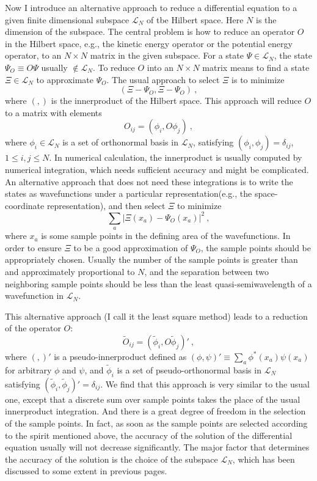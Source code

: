 Now I introduce an alternative approach to reduce a differential equation to
a given finite dimensional subspace $\mathcal{L}_N$ of tbe Hilbert space.
Here $N$ is the dimension of the subspace. The central problem is how
to reduce an operator $O$ in the Hilbert
space, e.g., the kinetic energy operator or the potential energy operator,
to an $N\times N$ matrix in the given subspace. For a state
$\Psi\in\mathcal{L}_N$, the state $\Psi_O\equiv O\Psi$ usually
$\notin\mathcal{L}_N$. To reduce $O$ into an $N\times N$ matrix means to
find a state $\Xi\in\mathcal{L}_N$ to approximate $\Psi_O$. The usual approach
to select $\Xi$ is to minimize
$$(\Xi-\Psi_O, \Xi-\Psi_O)~,$$
where $(,)$ is the
innerproduct of the Hilbert space. This approach will reduce $O$ to a matrix
with elements
$$O_{ij}=(\phi_i, O\phi_j)~,$$
where $\phi_i\in\mathcal{L}_N$ is a set of orthonormal basis in $\mathcal{L}_N$,
satisfying $(\phi_i, \phi_j)=\delta_{ij}$, $1\le i, j\le N$. In numerical
calculation, the innerproduct is usually computed by numerical integration,
which needs sufficient accuracy and might be complicated. An alternative approach
that does not need these integrations is to write the states as
wavefunctions under a particular representation(e.g., the space-coordinate
representation), and then select $\Xi$ to minimize
$$\sum_{a}{|\Xi(x_{a})-\Psi_{O}(x_{a})|}^{2}~,$$
where $x_a$ is some sample points in the defining area of the wavefunctions.
In order to ensure $\Xi$ to be a good approximation of $\Psi_O$, the sample
points should be appropriately chosen. Usually the number of the sample points
is greater than and approximately proportional to $N$, and the separation between
two neighboring sample points should be less than the least quasi-semiwavelength
of a wavefunction in $\mathcal{L}_N$.

This alternative approach (I call it the least square method)
leads to a reduction of the operator $O$:
$$\tilde{O}_{ij}=(\tilde{\phi}_{i}, O\tilde{\phi}_{j})'~,$$
where $(,)'$ is a pseudo-innerproduct defined as
$(\phi,\psi)'\equiv\sum_{a}\phi^{*}(x_{a})\psi(x_{a})$ for arbitrary $\phi$
and $\psi$, and $\tilde{\phi}_i$ is a set of pseudo-orthonormal basis in
$\mathcal{L}_N$ satisfying $(\tilde{\phi}_{i}, \tilde{\phi}_{j})'=\delta_{ij}$.
We find that this approach is very similar to the usual one, except that
a discrete sum over sample points takes the place of the usual innerproduct
integration. And there is a great degree of freedom in the selection of the sample
points. In fact, as soon as the sample points are selected according to the
spirit mentioned above, the accuracy of the solution of the differential
equation usually will not decrease significantly. The major factor that determines
the accuracy of the solution is the choice of the subspace $\mathcal{L}_N$, which
has been discussed to some extent in previous pages.

